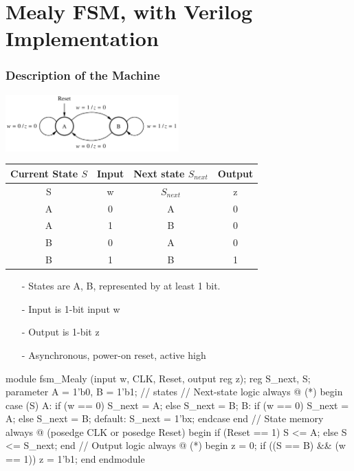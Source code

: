 \documentclass[12pt,openany]{book}
\begin{document}
\section{Mealy FSM, with Verilog Implementation}
\subsubsection*{Description of the Machine}
\begin{center}
	\includegraphics[width=0.5\textwidth]{circuits/17.2.png}
\end{center}

\begin{minipage}[htp]{0.6\textwidth}
	\footnotesize
		\begin{center}
			\begin{tabular}[w]{|cc|c|c|}
				\hline
				Current State $S$ & Input & Next state $S_{next}$ & Output \\
				\hline
				S & w & $S_{next}$ & z \\
				\hline
				
				A & 0 & A & 0 \\
				A & 1 & B & 0 \\
				B & 0 & A & 0 \\
				B & 1 & B & 1 \\
				\hline
				\end{tabular}
		\end{center}

\end{minipage}
\hfill
\vline
\hfill
\begin{minipage}[htp]{0.35\textwidth}

\begin{center}
	\begin{justify}
			\begin{itemize}
				\item[-] States are A, B, represented by at least 1 bit.
				\item[-] Input is 1-bit input w
				\item[-] Output is 1-bit z
				\item[-] Asynchronous, power-on reset, active high 
			\end{itemize}
	\end{justify}
\end{center}
\end{minipage}
\vfill
\begin{vhdl}
module fsm_Mealy (input w, CLK, Reset, output reg z);
	reg S_next, S;
	parameter A = 1'b0, B = 1'b1; // states
	// Next-state logic
	always @ (*) begin
		case (S)
		A: if (w == 0) S_next = A;
			else S_next = B;
		B: if (w == 0) S_next = A;
			else S_next = B;
		default: S_next = 1'bx;
		endcase
	end
	// State memory
	always @ (posedge CLK or posedge Reset) begin
		if (Reset == 1) S <= A;
		else S <= S_next;
	end
	// Output logic
	always @ (*) begin
		z = 0;
		if ((S == B) && (w == 1)) z = 1'b1;
	end
endmodule
\end{vhdl}
\end{document}
